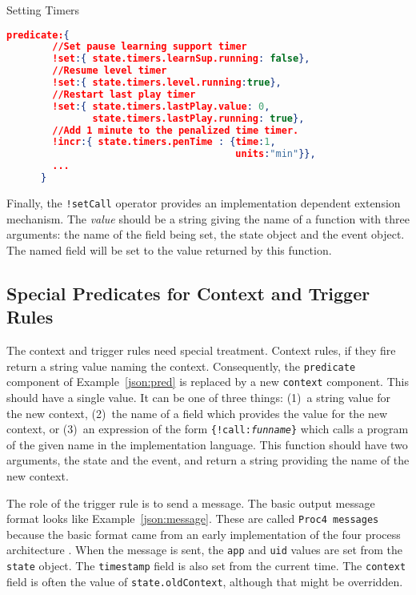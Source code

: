 \documentclass{article}
\begin{document}
  \begin{algorithm}
    \caption{Setting Timers}
    \label{json:time}
    \begin{lstlisting}[language=json]
      predicate:{
        //Set pause learning support timer
        !set:{ state.timers.learnSup.running: false},
        //Resume level timer
        !set:{ state.timers.level.running:true},
        //Restart last play timer
        !set:{ state.timers.lastPlay.value: 0,
               state.timers.lastPlay.running: true},
        //Add 1 minute to the penalized time timer.
        !incr:{ state.timers.penTime : {time:1,
                                        units:"min"}},
        ...
      }
    \end{lstlisting}
  \end{algorithm}
  
  Finally, the \texttt{!setCall} operator provides an implementation
  dependent extension mechanism.  The \textit{value} should be a
  string giving the name of a function with three arguments:  the name
  of the field being set, the state object and the event object.  The
  named field will be set to the value returned by this function.

  \subsection{Special Predicates for Context and Trigger Rules}
  \label{sub:specRule}

  The context and trigger rules need special treatment.  Context
  rules, if they fire return a string value naming the context.
  Consequently, the \texttt{predicate} component of
  Example~\ref{json:pred} is replaced by a new \texttt{context}
  component.  This should have a single value.  It can be one of three
  things:  (1)~a string value for the new context, (2)~the name of a
  field which provides the value for the new context, or (3)~an
  expression of the form \texttt{\{!call:\textit{funname}\}} which
  calls a program of the given name in the implementation language.
  This function should have two arguments, the state and the event,
  and return a string providing the name of the new context.
  
  The role of the trigger rule is to send a message.  The basic output
  message format looks like Example~\ref{json:message}.  These are
  called \texttt{Proc4 messages} because the basic format came from an
  early implementation of the four process architecture \cite{Proc4}.
  When the message is sent, the \texttt{app} and \texttt{uid} values
  are set from the \texttt{state} object.  The \texttt{timestamp}
  field is also set from the current time.  The \texttt{context} field
  is often the value of \texttt{state.oldContext}, although that might
  be overridden.
\end{document}
